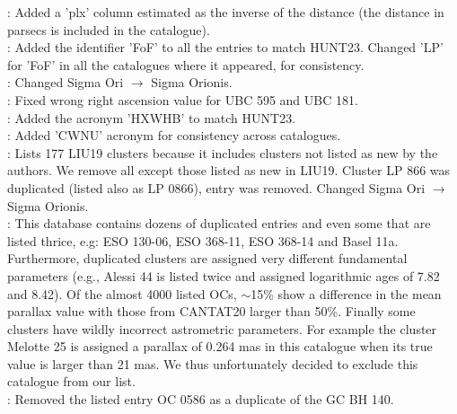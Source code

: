 \documentclass[fleqn,usenatbib]{mnras}
\begin{document}
\noindent\cite{Sim_2019}: Added a 'plx' column estimated as the inverse of the distance 
(the distance in parsecs is included in the catalogue).\\

\noindent\citet[][LIU19]{Liu_2019}: Added the identifier 'FoF' to all the entries to
match HUNT23. Changed 'LP' for 'FoF' in all the catalogues where it appeared,
for consistency.\\

\noindent\cite{Cantat-Gaudin_2020}: Changed Sigma Ori $\rightarrow$ Sigma Orionis.\\

\noindent\cite{Castro-Ginard_2020}: Fixed wrong right ascension value for UBC
595 and UBC 181.\\

\noindent\cite{Hao_2020}: Added the acronym 'HXWHB' to match HUNT23.\\

\noindent\cite{He_2021}: Added 'CWNU' acronym for consistency across catalogues.\\

\noindent\cite{Dias_2021}: Lists 177 LIU19 clusters because it includes
clusters not listed as new by the authors. We remove all except those listed as
new in LIU19. Cluster LP 866 was duplicated (listed also as LP 0866), entry was
removed. Changed Sigma Ori $\rightarrow$ Sigma Orionis.\\

\noindent\cite{Hao_2021}: This database contains dozens of duplicated entries and even
some that are listed thrice, e.g: ESO 130-06, ESO 368-11, ESO 368-14 and
Basel 11a. Furthermore, duplicated clusters are assigned very
different fundamental parameters (e.g., Alessi 44 is listed twice and assigned
logarithmic ages of 7.82 and 8.42). Of the almost 4000 listed OCs, $\sim$15\%
show a difference in the mean parallax value with those from CANTAT20 larger
than 50\%. Finally some clusters have wildly incorrect astrometric parameters.
For example the cluster Melotte 25 is assigned a parallax of 0.264 mas in this
catalogue when its true value is larger than 21 mas. We thus unfortunately
decided to exclude this catalogue from our list.\\

\noindent\cite{Hao_2022}: Removed the listed entry OC 0586 as a duplicate of the GC BH
140.\\
\end{document}
